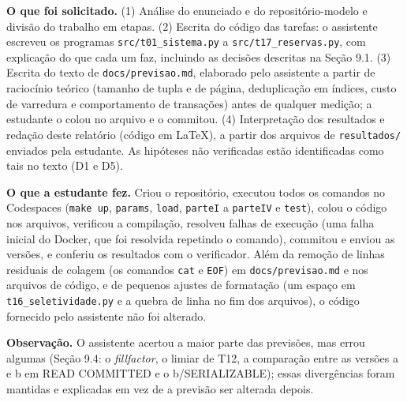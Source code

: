 \documentclass[11pt,a4paper]{article}
\newcommand{\tp}[1]{\texttt{#1}}
\begin{document}
\textbf{O que foi solicitado.} (1) Análise do enunciado e do repositório-modelo e divisão do trabalho em etapas. (2) Escrita do código das tarefas: o assistente escreveu os programas \tp{src/t01\_sistema.py} a \tp{src/t17\_reservas.py}, com explicação do que cada um faz, incluindo as decisões descritas na Seção 9.1. (3) Escrita do texto de \tp{docs/previsao.md}, elaborado pelo assistente a partir de raciocínio teórico (tamanho de tupla e de página, deduplicação em índices, custo de varredura e comportamento de transações) antes de qualquer medição; a estudante o colou no arquivo e o commitou. (4) Interpretação dos resultados e redação deste relatório (código em \LaTeX), a partir dos arquivos de \tp{resultados/} enviados pela estudante. As hipóteses não verificadas estão identificadas como tais no texto (D1 e D5).

\textbf{O que a estudante fez.} Criou o repositório, executou todos os comandos no Codespaces (\tp{make up}, \tp{params}, \tp{load}, \tp{parteI} a \tp{parteIV} e \tp{test}), colou o código nos arquivos, verificou a compilação, resolveu falhas de execução (uma falha inicial do Docker, que foi resolvida repetindo o comando), commitou e enviou as versões, e conferiu os resultados com o verificador. Além da remoção de linhas residuais de colagem (os comandos \tp{cat} e \tp{EOF}) em \tp{docs/previsao.md} e nos arquivos de código, e de pequenos ajustes de formatação (um espaço em \tp{t16\_seletividade.py} e a quebra de linha no fim dos arquivos), o código fornecido pelo assistente não foi alterado.

\textbf{Observação.} O assistente acertou a maior parte das previsões, mas errou algumas (Seção 9.4: o \emph{fillfactor}, o limiar de T12, a comparação entre as versões a e b em READ COMMITTED e o b/SERIALIZABLE); essas divergências foram mantidas e explicadas em vez de a previsão ser alterada depois.
\end{document}

